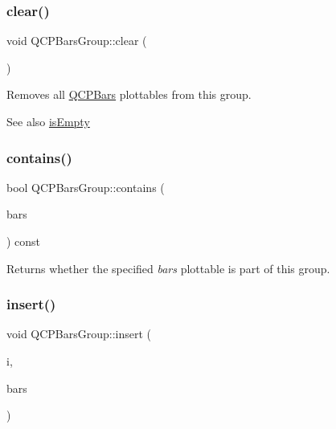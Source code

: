 \subsubsection{\texorpdfstring{clear()}{clear()}}
{\footnotesize\ttfamily void Q\+C\+P\+Bars\+Group\+::clear (\begin{DoxyParamCaption}{ }\end{DoxyParamCaption})}

Removes all \mbox{\hyperlink{class_q_c_p_bars}{Q\+C\+P\+Bars}} plottables from this group.

\begin{DoxySeeAlso}{See also}
\mbox{\hyperlink{class_q_c_p_bars_group_aac959e79e852e8ef9aea6e0449ad000a}{is\+Empty}} 
\end{DoxySeeAlso}
\mbox{\label{class_q_c_p_bars_group_ae26da07a23553052a178fb3fae90d0dc}} 
\subsubsection{\texorpdfstring{contains()}{contains()}}
{\footnotesize\ttfamily bool Q\+C\+P\+Bars\+Group\+::contains (\begin{DoxyParamCaption}\item[{\mbox{\hyperlink{class_q_c_p_bars}{Q\+C\+P\+Bars}} $\ast$}]{bars }\end{DoxyParamCaption}) const\hspace{0.3cm}{\ttfamily [inline]}}

Returns whether the specified {\itshape bars} plottable is part of this group. \mbox{\label{class_q_c_p_bars_group_a309a5f7233db189f3ea9c2d04ece6c13}} 
\subsubsection{\texorpdfstring{insert()}{insert()}}
{\footnotesize\ttfamily void Q\+C\+P\+Bars\+Group\+::insert (\begin{DoxyParamCaption}\item[{int}]{i,  }\item[{\mbox{\hyperlink{class_q_c_p_bars}{Q\+C\+P\+Bars}} $\ast$}]{bars }\end{DoxyParamCaption})}

